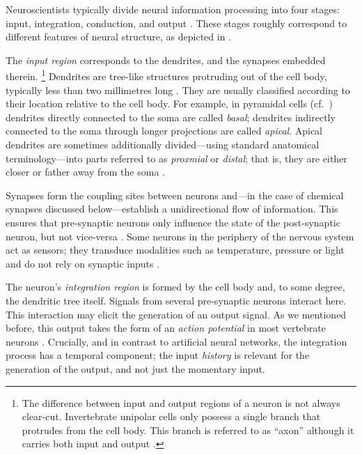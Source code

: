 Neuroscientists typically divide neural information processing into four stages: input, integration, conduction, and output \citep[Chapter 2]{kandel2012principles}.
These stages roughly correspond to different features of neural structure, as depicted in .

The \emph{input region} corresponds to the dendrites, and the synapses embedded therein.%
\footnote{
The difference between input and output regions of a neuron is not always clear-cut.
Invertebrate unipolar cells only possess a single branch that protrudes from the cell body.
This branch is referred to as \enquote{axon} although it carries both input and output \citep[Chapter~2]{kandel2012principles}.}
Dendrites are tree-like structures protruding out of the cell body, typically less than two millimetres long \citep[Chapter~1]{bear2016neuroscience}.
They are usually classified according to their location relative to the cell body.
For example, in pyramidal cells (cf.~) dendrites directly connected to the soma are called \emph{basal}; dendrites indirectly connected to the soma through longer projections are called \emph{apical}.
Apical dendrites are sometimes additionally divided---using standard anatomical terminology---into parts referred to as \emph{proxmial} or \emph{distal}; that is, they are either closer or father away from the soma \citep[e.g.,][Figure~5]{seamans1997contributions}.

Synapses form the coupling sites between neurons and---in the case of chemical synapses discussed below---establish a unidirectional flow of information.
This ensures that pre-synaptic neurons only influence the state of the post-synaptic neuron, but not vice-versa \citep[Chapter~8]{kandel2012principles}.
Some neurons in the periphery of the nervous system act as sensors; they transduce modalities such as temperature, pressure or light and do not rely on synaptic inputs \citep[Chapter~22]{kandel2012principles}.

The neuron's \emph{integration region} is formed by the cell body and, to some degree, the dendritic tree itself.
Signals from several pre-synaptic neurons interact here.
This interaction may elicit the generation of an output signal.
As we mentioned before, this output takes the form of an \emph{action potential} in most vertebrate neurons \citep[Chapter~2]{kandel2012principles}.
Crucially, and in contrast to artificial neural networks, the integration process has a temporal component; the input \emph{history} is relevant for the generation of the output, and not just the momentary input.

